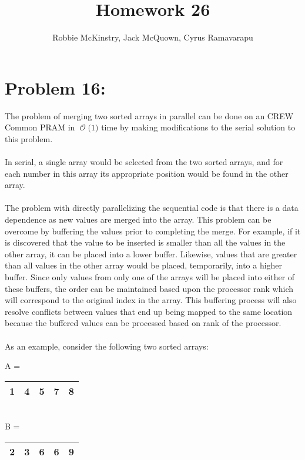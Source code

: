 \documentclass[12pt]{article}
\newcommand{\BigO}[1]{\ensuremath{\operatorname{\mathcal{O}}\bigl(#1\bigr)}}
\begin{document}
\title{Homework 26}
\author{Robbie McKinstry, Jack McQuown, Cyrus Ramavarapu}
\renewcommand{\today}{2 November 2016}
\renewcommand{\baselinestretch}{1.5}
\maketitle

\section*{Problem 16: }
The problem of merging two sorted arrays in parallel can
be done on an CREW Common PRAM in \BigO{1} time by making
modifications to the serial solution to this problem.\\\\
In serial, a single array would be selected from the two 
sorted arrays, and for each number in this array its appropriate
position would be found in the other array.\\\\
The problem with directly parallelizing the sequential code 
is that there is a data dependence as new values are merged into
the array.  This problem can be overcome by buffering the values
prior to completing the merge.  For example, if it is discovered
that the value to be inserted is smaller than all the values in
the other array, it can be placed into a lower buffer.  Likewise,
values that are greater than all values in the other array would
be placed, temporarily, into a higher buffer.  Since only values
from only one of the arrays will be placed into either of these 
buffers, the order can be maintained based upon the processor rank
which will correspond to the original index in the array.  This
buffering process will also resolve conflicts between values that
end up being mapped to the same location because the buffered values
can be processed based on rank of the processor.\\\\
As an example, consider the following two sorted arrays:\\
\begin{center}
A = 
\begin{tabular}{|c|c|c|c|c|}
\hline
1 & 4  & 5 & 7 & 8\\\hline
\end{tabular}
\\B =  
\begin{tabular}{|c|c|c|c|c|}
\hline
2 & 3  & 6 & 6 & 9\\ \hline
\end{tabular}
\end{center}
\end{document}
